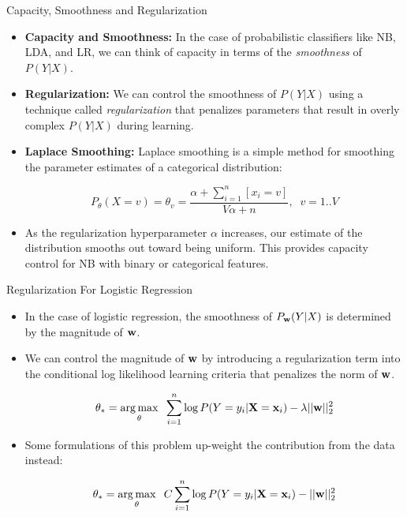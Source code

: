 \documentclass[serif,xcolor=pdftex,dvipsnames,table,hyperref={bookmarks=false}]{beamer}
\begin{document}
\begin{frame}[t]{Capacity, Smoothness and Regularization}

\begin{itemize}
\setlength{\itemsep}{6pt}

\item \textbf{Capacity and Smoothness:} In the case of probabilistic classifiers like NB, LDA, and LR, we can think of capacity in terms of the \textit{smoothness} of $P(Y|X)$. 

\pause\item \textbf{Regularization:} We can control the smoothness of $P(Y|X)$ using a technique called \textit{regularization} that penalizes parameters that result in overly complex $P(Y|X)$ during learning.

\pause\item \textbf{Laplace Smoothing:} Laplace smoothing is a simple method for smoothing the parameter estimates of a categorical distribution:

$$P_{\theta}(X=v)=\theta_v = \frac{\alpha + \sum_{i=1}^n[x_i=v]}{V\alpha + n}, \;\; v=1..V$$

\pause\item As the regularization hyperparameter $\alpha$ increases, our estimate of the distribution smooths out toward being uniform. This provides capacity control for NB with binary or categorical features. 


\end{itemize}
\end{frame}

\begin{frame}[t]{Regularization For Logistic Regression}

\begin{itemize}
\setlength{\itemsep}{6pt}

\item In the case of logistic regression, the smoothness of $P_{{\mathbf{w}}}(Y|X)$ is determined by the magnitude of ${\mathbf{w}}$. 

\pause\item We can control the magnitude of ${\mathbf{w}}$ by introducing a regularization term into the conditional log likelihood learning criteria that penalizes the norm of ${\mathbf{w}}$. 

\pause
$$\theta_* = \operatorname*{arg\,max}_{\theta}\;\;\sum_{i=1}^n \log P(Y=y_i|{\mathbf{X}}={\mathbf{x}}_i) - \lambda ||{\mathbf{w}}||_2^2 $$

\pause\item Some formulations of this problem up-weight the contribution from the data instead:

$$\theta_* =  \operatorname*{arg\,max}_{\theta}\;\; C\sum_{i=1}^n \log P(Y=y_i|{\mathbf{X}}={\mathbf{x}}_i) - ||{\mathbf{w}}||_2^2 $$

\end{itemize}
\end{frame}
\end{document}
